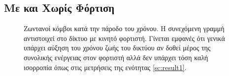 \subsection{Με και Χωρίς Φόρτιση}\label{subc:result6_1}
\begin{figure}[H]
  \centering
  \caption{Ζωντανοί κόμβοι κατά την πάροδο του χρόνου. Η συνεχόμενη γραμμή αντιστοιχεί στο δίκτυο με κινητό φορτιστή. Γίνεται εμφανές ότι γενικά υπάρχει αύξηση
	του χρόνου ζωής του δικτύου αν δοθεί μέρος της συνολικής ενέργειας στον φορτιστή αλλά δεν υπάρχει τόση καλή ισορροπία όπως στις μετρήσεις της ενότητας
\ref{sc:result1}.}
  \label{fig:5_1exp_1_1}
\end{figure}



